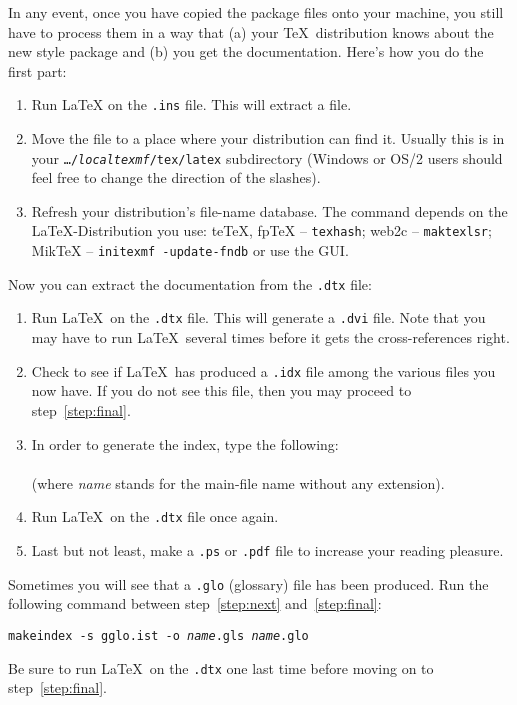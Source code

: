 In any event, once you have copied the package files onto your
machine, you still have to process them in a way that (a) your
\TeX\ distribution knows about the new style package and (b) you get
the documentation.  Here's how you do the first part:

\begin{enumerate}
\item Run \LaTeX{} on the \texttt{.ins} file. This will
  extract a  file.
\item Move the  file to a place where your distribution
  can find it. Usually this is in your \texttt{\ldots/\emph{localtexmf}/tex/latex}
  subdirectory (Windows or OS/2 users should feel free to change the
  direction of the slashes).
\item Refresh your distribution's file-name database. The command
  depends on the \LaTeX-Distribution you use:
  teTeX, fpTeX -- \texttt{texhash}; web2c -- \texttt{maktexlsr};
  MikTeX -- \texttt{initexmf -update-fndb} or use the GUI.
\end{enumerate}

\noindent Now you can extract the documentation from the
\texttt{.dtx} file:

\begin{enumerate}
\item Run \LaTeX\ on the \texttt{.dtx} file.  This will generate a
  \texttt{.dvi} file. Note that you may have to run \LaTeX\
  several times before it gets the cross-references right.
\item Check to see if \LaTeX\ has produced a \texttt{.idx} file
  among the various files you now have.
  If you do not see this file, then you may proceed to
  step~\ref{step:final}.
\item In order to generate the index, type the following:\\
        \\
        (where \textit{name} stands for the main-file name without any
    extension).
 \item Run \LaTeX\ on the \texttt{.dtx} file once again. \label{step:next}
    
\item Last but not least, make a \texttt{.ps} or \texttt{.pdf}
  file to increase your reading pleasure.\label{step:final}
  
\end{enumerate}

Sometimes you will see that a \texttt{.glo}
(glossary) file has been produced. Run the following
command between
step~\ref{step:next} and~\ref{step:final}:

\noindent\texttt{makeindex -s gglo.ist -o \textit{name}.gls \textit{name}.glo}

\noindent Be sure to run \LaTeX\ on the \texttt{.dtx} one last
time before moving on to step~\ref{step:final}.











